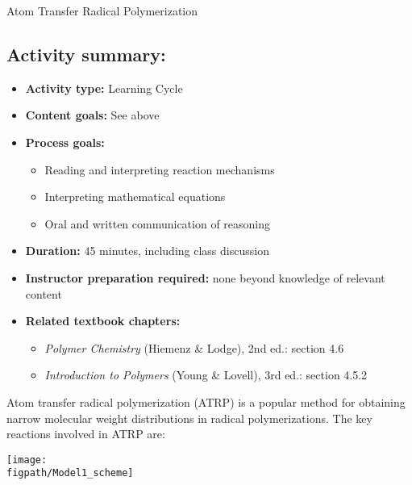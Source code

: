 \begin{activity}{Atom Transfer Radical Polymerization}
\begin{instructornotes}
	\subsection*{Activity summary:}
	\begin{itemize}
		\item \textbf{Activity type:} Learning Cycle
		\item \textbf{Content goals:} See above
		\item \textbf{Process goals:} %
			\begin{itemize}
				\item Reading and interpreting reaction mechanisms
				\item Interpreting mathematical equations
				\item Oral and written communication of reasoning
			\end{itemize}
		\item \textbf{Duration:} 45 minutes, including class discussion
		\item \textbf{Instructor preparation required:} none beyond knowledge of relevant content
		\item \textbf{Related textbook chapters:}
			\begin{itemize}
				\item \emph{Polymer Chemistry} (Hiemenz \& Lodge), 2nd ed.: section 4.6
				\item \emph{Introduction to Polymers} (Young \& Lovell), 3rd ed.: section 4.5.2
			\end{itemize}
	\end{itemize}
	
\end{instructornotes}


\begin{model}
	\label{\labelbase:mdl:ATRPrxns}

	Atom transfer radical polymerization (ATRP) is a popular method for obtaining narrow molecular weight distributions in radical polymerizations.  The key reactions involved in ATRP are:
	
	\centerline{\texttt{[image: \\figpath/Model1\_scheme]}}
	

\end{model}
\end{activity}
